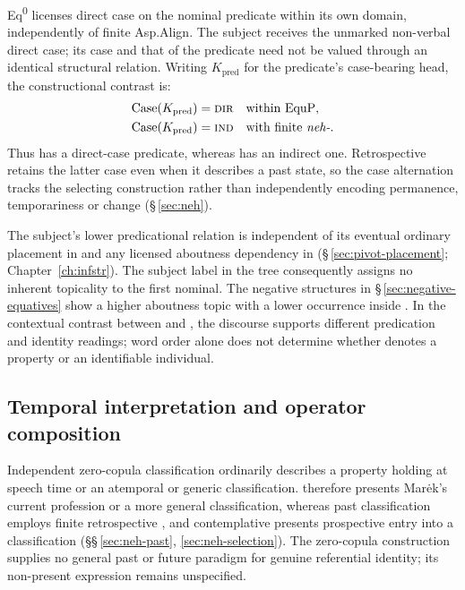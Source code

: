 \noindent Eq\textsuperscript{0} licenses direct case on the nominal
predicate within its own domain, independently of finite Asp.Align. The
subject receives the unmarked non-verbal direct case; its case and that of
the predicate need not be valued through an identical structural relation.
Writing \(K_{\mathrm{pred}}\) for the predicate's case-bearing head, the
constructional contrast is:
\[
\begin{aligned}
 \operatorname{Case}(K_{\mathrm{pred}})&=\textsc{dir}
   &&\text{within EquP},\\
 \operatorname{Case}(K_{\mathrm{pred}})&=\textsc{ind}
   &&\text{with finite \textit{neh-}}.
\end{aligned}
\]
Thus   has a direct-case
predicate, whereas   has an indirect one. Retrospective  retains the latter
case even when it describes a past state, so the case alternation tracks
the selecting construction rather than independently encoding permanence,
temporariness or change (§\,\ref{sec:neh}).

The subject's lower predicational relation is independent of its eventual
ordinary placement in  and any licensed aboutness dependency
in  (§\,\ref{sec:pivot-placement};
Chapter~\ref{ch:infstr}). The subject label in the tree consequently
assigns no inherent topicality to the first nominal. The negative structures
in §\,\ref{sec:negative-equatives} show a higher aboutness topic with a
lower occurrence inside . In the contextual contrast between
  and  , the discourse supports different
predication and identity readings; word order alone does not determine
whether  denotes a property or an identifiable individual.

\subsection{Temporal interpretation and operator composition}

Independent zero-copula classification ordinarily describes a property
holding at speech time or an atemporal or generic classification.
 therefore presents Marėk's current profession or a more general
classification, whereas past classification employs finite retrospective
, and contemplative  presents prospective entry into
a classification (§§\,\ref{sec:neh-past}, \ref{sec:neh-selection}).
The zero-copula construction
supplies no general past or future paradigm for genuine referential identity;
its non-present expression remains unspecified.


